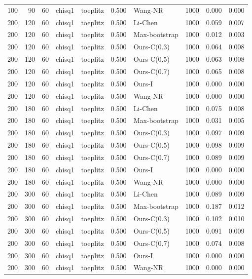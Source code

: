 \begin{tabular}{rrrllrlrrr}
100 & 90 & 60 & chisq1 & toeplitz & 0.500 & Wang-NR & 1000 & 0.000 & 0.000 \\
200 & 120 & 60 & chisq1 & toeplitz & 0.500 & Li-Chen & 1000 & 0.059 & 0.007 \\
200 & 120 & 60 & chisq1 & toeplitz & 0.500 & Max-bootstrap & 1000 & 0.012 & 0.003 \\
200 & 120 & 60 & chisq1 & toeplitz & 0.500 & Ours-C(0.3) & 1000 & 0.064 & 0.008 \\
200 & 120 & 60 & chisq1 & toeplitz & 0.500 & Ours-C(0.5) & 1000 & 0.063 & 0.008 \\
200 & 120 & 60 & chisq1 & toeplitz & 0.500 & Ours-C(0.7) & 1000 & 0.065 & 0.008 \\
200 & 120 & 60 & chisq1 & toeplitz & 0.500 & Ours-I & 1000 & 0.000 & 0.000 \\
200 & 120 & 60 & chisq1 & toeplitz & 0.500 & Wang-NR & 1000 & 0.000 & 0.000 \\
200 & 180 & 60 & chisq1 & toeplitz & 0.500 & Li-Chen & 1000 & 0.075 & 0.008 \\
200 & 180 & 60 & chisq1 & toeplitz & 0.500 & Max-bootstrap & 1000 & 0.031 & 0.005 \\
200 & 180 & 60 & chisq1 & toeplitz & 0.500 & Ours-C(0.3) & 1000 & 0.097 & 0.009 \\
200 & 180 & 60 & chisq1 & toeplitz & 0.500 & Ours-C(0.5) & 1000 & 0.098 & 0.009 \\
200 & 180 & 60 & chisq1 & toeplitz & 0.500 & Ours-C(0.7) & 1000 & 0.089 & 0.009 \\
200 & 180 & 60 & chisq1 & toeplitz & 0.500 & Ours-I & 1000 & 0.000 & 0.000 \\
200 & 180 & 60 & chisq1 & toeplitz & 0.500 & Wang-NR & 1000 & 0.000 & 0.000 \\
200 & 300 & 60 & chisq1 & toeplitz & 0.500 & Li-Chen & 1000 & 0.089 & 0.009 \\
200 & 300 & 60 & chisq1 & toeplitz & 0.500 & Max-bootstrap & 1000 & 0.187 & 0.012 \\
200 & 300 & 60 & chisq1 & toeplitz & 0.500 & Ours-C(0.3) & 1000 & 0.102 & 0.010 \\
200 & 300 & 60 & chisq1 & toeplitz & 0.500 & Ours-C(0.5) & 1000 & 0.091 & 0.009 \\
200 & 300 & 60 & chisq1 & toeplitz & 0.500 & Ours-C(0.7) & 1000 & 0.074 & 0.008 \\
200 & 300 & 60 & chisq1 & toeplitz & 0.500 & Ours-I & 1000 & 0.000 & 0.000 \\
200 & 300 & 60 & chisq1 & toeplitz & 0.500 & Wang-NR & 1000 & 0.000 & 0.000 \\

\end{tabular}

